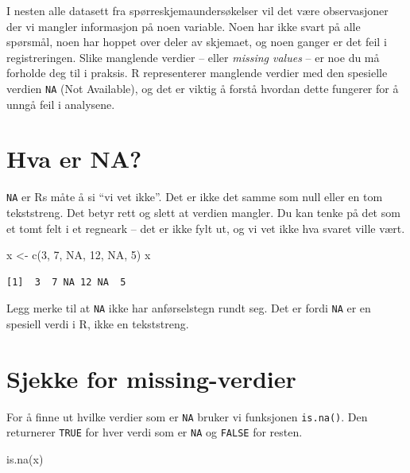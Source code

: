 \documentclass[
  norsk,
  letterpaper,
  DIV=11,
  numbers=noendperiod]{scrreprt}
\newenvironment{Shaded}{\begin{snugshade}}{\end{snugshade}}
\newcommand{\ConstantTok}[1]{\textcolor[rgb]{0.56,0.35,0.01}{#1}}
\newcommand{\DecValTok}[1]{\textcolor[rgb]{0.68,0.00,0.00}{#1}}
\newcommand{\FunctionTok}[1]{\textcolor[rgb]{0.28,0.35,0.67}{#1}}
\newcommand{\NormalTok}[1]{\textcolor[rgb]{0.00,0.23,0.31}{#1}}
\newcommand{\OtherTok}[1]{\textcolor[rgb]{0.00,0.23,0.31}{#1}}
\theoremstyle{definition}
\theoremstyle{remark}
\begin{document}
I nesten alle datasett fra spørreskjemaundersøkelser vil det være
observasjoner der vi mangler informasjon på noen variable. Noen har ikke
svart på alle spørsmål, noen har hoppet over deler av skjemaet, og noen
ganger er det feil i registreringen. Slike manglende verdier -- eller
\emph{missing values} -- er noe du må forholde deg til i praksis. R
representerer manglende verdier med den spesielle verdien \texttt{NA}
(Not Available), og det er viktig å forstå hvordan dette fungerer for å
unngå feil i analysene.

\section{Hva er NA?}\label{hva-er-na}

\texttt{NA} er Rs måte å si ``vi vet ikke''. Det er ikke det samme som
null eller en tom tekststreng. Det betyr rett og slett at verdien
mangler. Du kan tenke på det som et tomt felt i et regneark -- det er
ikke fylt ut, og vi vet ikke hva svaret ville vært.

\begin{Shaded}
\begin{Highlighting}[]
\NormalTok{x }\OtherTok{\textless{}{-}} \FunctionTok{c}\NormalTok{(}\DecValTok{3}\NormalTok{, }\DecValTok{7}\NormalTok{, }\ConstantTok{NA}\NormalTok{, }\DecValTok{12}\NormalTok{, }\ConstantTok{NA}\NormalTok{, }\DecValTok{5}\NormalTok{)}
\NormalTok{x}
\end{Highlighting}
\end{Shaded}

\begin{verbatim}
[1]  3  7 NA 12 NA  5
\end{verbatim}

Legg merke til at \texttt{NA} ikke har anførselstegn rundt seg. Det er
fordi \texttt{NA} er en spesiell verdi i R, ikke en tekststreng.

\section{Sjekke for missing-verdier}\label{sjekke-for-missing-verdier}

For å finne ut hvilke verdier som er \texttt{NA} bruker vi funksjonen
\texttt{is.na()}. Den returnerer \texttt{TRUE} for hver verdi som er
\texttt{NA} og \texttt{FALSE} for resten.

\begin{Shaded}
\begin{Highlighting}[]
\FunctionTok{is.na}\NormalTok{(x)}
\end{Highlighting}
\end{Shaded}
\end{document}
